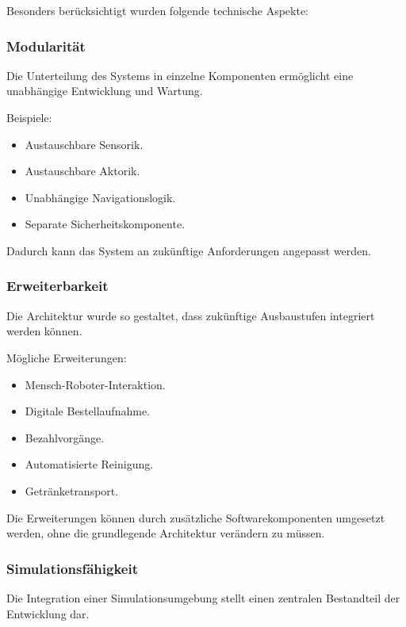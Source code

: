 \documentclass[
  a4paper,
  12pt,
  DIV=12,        %
  parskip=half,  %
  headings=small %
]{scrartcl}
\theoremstyle{definition}
\providecommand{\tightlist}{%
  \setlength{\itemsep}{0pt}\setlength{\parskip}{0pt}}
\theoremstyle{definition}
\begin{document}
Besonders berücksichtigt wurden folgende technische Aspekte:

\subsubsection{Modularität}\label{modularituxe4t}

Die Unterteilung des Systems in einzelne Komponenten ermöglicht eine
unabhängige Entwicklung und Wartung.

Beispiele:

\begin{itemize}
\tightlist
\item
  Austauschbare Sensorik.
\item
  Austauschbare Aktorik.
\item
  Unabhängige Navigationslogik.
\item
  Separate Sicherheitskomponente.
\end{itemize}

Dadurch kann das System an zukünftige Anforderungen angepasst werden.

\subsubsection{Erweiterbarkeit}\label{erweiterbarkeit}

Die Architektur wurde so gestaltet, dass zukünftige Ausbaustufen
integriert werden können.

Mögliche Erweiterungen:

\begin{itemize}
\tightlist
\item
  Mensch-Roboter-Interaktion.
\item
  Digitale Bestellaufnahme.
\item
  Bezahlvorgänge.
\item
  Automatisierte Reinigung.
\item
  Getränketransport.
\end{itemize}

Die Erweiterungen können durch zusätzliche Softwarekomponenten umgesetzt
werden, ohne die grundlegende Architektur verändern zu müssen.

\subsubsection{Simulationsfähigkeit}\label{simulationsfuxe4higkeit}

Die Integration einer Simulationsumgebung stellt einen zentralen
Bestandteil der Entwicklung dar.
\end{document}

